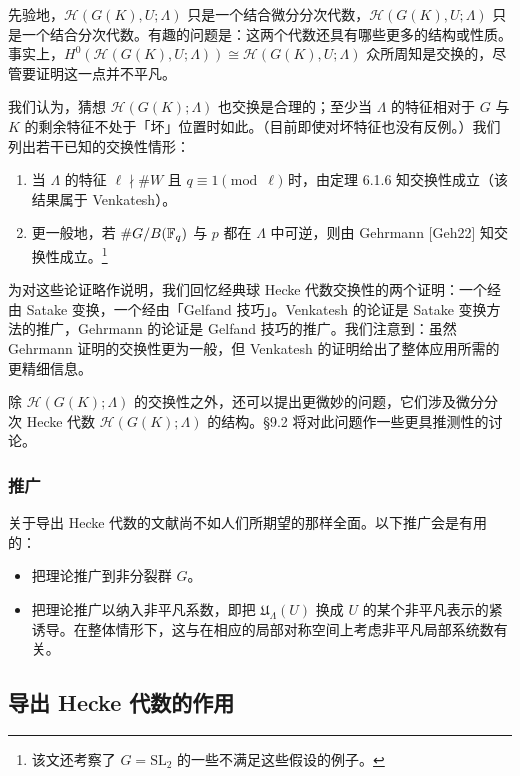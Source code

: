 先验地，$\mathscr H(G(K),U;\Lambda)$ 只是一个结合微分分次代数，$\mathcal H(G(K),U;\Lambda)$ 只是一个结合分次代数。有趣的问题是：这两个代数还具有哪些更多的结构或性质。事实上，$H^0(\mathscr H(G(K),U;\Lambda))\cong\mathcal H(G(K),U;\Lambda)$ 众所周知是交换的，尽管要证明这一点并不平凡。

我们认为，猜想 $\mathcal H(G(K);\Lambda)$ 也交换是合理的；至少当 $\Lambda$ 的特征相对于 $G$ 与 $K$ 的剩余特征不处于「坏」位置时如此。（目前即使对坏特征也没有反例。）我们列出若干已知的交换性情形：
\begin{enumerate}[(1)]
\item 当 $\Lambda$ 的特征 $\ell\nmid\#W$ 且 $q\equiv1\pmod\ell$ 时，由定理 6.1.6 知交换性成立（该结果属于 Venkatesh）。
\item 更一般地，若 $\#G/B(\mathbb{F}_q)$ 与 $p$ 都在 $\Lambda$ 中可逆，则由 Gehrmann [Geh22] 知交换性成立。\footnote{该文还考察了 $G=\mathrm{SL}_2$ 的一些不满足这些假设的例子。}
\end{enumerate}


为对这些论证略作说明，我们回忆经典球 Hecke 代数交换性的两个证明：一个经由 Satake 变换，一个经由「Gelfand 技巧」。Venkatesh 的论证是 Satake 变换方法的推广，Gehrmann 的论证是 Gelfand 技巧的推广。我们注意到：虽然 Gehrmann 证明的交换性更为一般，但 Venkatesh 的证明给出了整体应用所需的更精细信息。

除 $\mathcal H(G(K);\Lambda)$ 的交换性之外，还可以提出更微妙的问题，它们涉及微分分次 Hecke 代数 $\mathscr H(G(K);\Lambda)$ 的结构。§9.2 将对此问题作一些更具推测性的讨论。

\subsubsection{推广}

关于导出 Hecke 代数的文献尚不如人们所期望的那样全面。以下推广会是有用的：
\begin{itemize}[leftmargin=2em]
\item 把理论推广到非分裂群 $G$。
\item 把理论推广以纳入非平凡系数，即把 $\mathfrak U_\Lambda(U)$ 换成 $U$ 的某个非平凡表示的紧诱导。在整体情形下，这与在相应的局部对称空间上考虑非平凡局部系统数有关。
\end{itemize}

\subsection{导出 Hecke 代数的作用}

